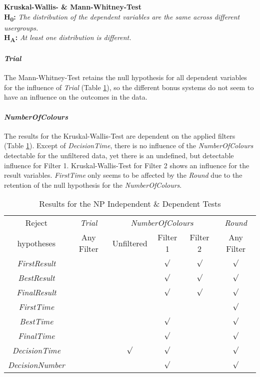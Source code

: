 \textbf{Kruskal-Wallis- \& Mann-Whitney-Test} \\
\textbf{H\textsubscript{0}:} \textit{The distribution of the dependent variables are the same across different usergroups.}\\
\textbf{H\textsubscript{A}:} \textit{At least one distribution is different.}

\paragraph{\textit{Trial}}
The Mann-Whitney-Test retains the null hypothesis for all dependent variables for the influence of \textit{Trial} (Table \ref{NPTest}), so the different bonus systems do not seem to have an influence on the outcomes in the data.

\paragraph{\textit{NumberOfColours}}
The results for the Kruskal-Wallis-Test are dependent on the applied filters (Table \ref{NPTest}). Except of \textit{DecisionTime}, there is no influence of the \textit{NumberOfColours} detectable for the unfiltered data, yet there is an undefined, but detectable influence for Filter 1. Kruskal-Wallis-Test for Filter 2 shows an influence for the result variables.
\textit{FirstTime} only seems to be affected by the \textit{Round} due to the retention of the null hypothesis for the \textit{NumberOfColours}. 
\begin{table}[htbp]
  \centering
  \caption{Results for the NP Independent \& Dependent Tests}
    \label{Results for the NP Test}
    \begin{tabular}{c|c|ccc|c}
    \toprule
       Reject   & \textit{Trial} & \multicolumn{3}{c|}{\textit{NumberOfColours}} & \textit{Round} \\
       hypotheses  & Any Filter & Unfiltered & Filter 1 & \multicolumn{1}{c|}{Filter 2} & Any Filter \\
    \midrule
	\textit{FirstResult} & &              & $\surd$     & $\surd$     &  $\surd$ \\
    \textit{BestResult} & &         	  & $\surd$     & $\surd$	   & $\surd$\\
    \textit{FinalResult} & &         	  & $\surd$ 	 & $\surd$	   & $\surd$ \\
    \textit{FirstTime} & &         		  &       		 &       	   & $\surd$ \\
    \textit{BestTime} & &         		  & $\surd$     &              & $\surd$ \\
    \textit{FinalTime} & &         		  & $\surd$     &              & $\surd$ \\
    \textit{DecisionTime} & &  $\surd$    & $\surd$     &       	   & $\surd$ \\
    \textit{DecisionNumber} & &           & $\surd$     &       	   & $\surd$ \\
    \bottomrule
    \end{tabular}%
  \label{NPTest}%
\end{table}%

